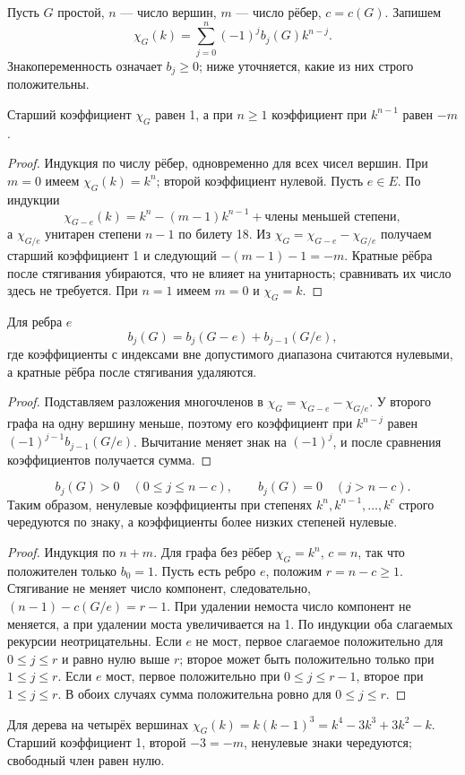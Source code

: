 \begin{definition}
Пусть \(G\) простой, \(n\) — число вершин, \(m\) — число рёбер,
\(c=c(G)\). Запишем
\[
 \chi_G(k)=\sum_{j=0}^n(-1)^j b_j(G)k^{n-j}.
\]
Знакопеременность означает \(b_j\ge0\); ниже уточняется, какие из них строго положительны.
\end{definition}
\begin{theorem}
Старший коэффициент \(\chi_G\) равен 1, а при \(n\ge1\) коэффициент
при \(k^{n-1}\) равен \(-m\).
\end{theorem}
\begin{proof}
Индукция по числу рёбер, одновременно для всех чисел вершин.
При \(m=0\) имеем \(\chi_G(k)=k^n\); второй коэффициент нулевой.
Пусть \(e\in E\). По индукции
\[
\chi_{G-e}(k)=k^n-(m-1)k^{n-1}+\text{члены меньшей степени},
\]
а \(\chi_{G/e}\) унитарен степени \(n-1\) по билету 18.
Из \(\chi_G=\chi_{G-e}-\chi_{G/e}\) получаем старший коэффициент 1
и следующий \(-(m-1)-1=-m\). Кратные рёбра после стягивания
убираются, что не влияет на унитарность; сравнивать их число здесь не требуется.
При \(n=1\) имеем \(m=0\) и \(\chi_G=k\).
\end{proof}
\begin{lemma}
Для ребра \(e\)
\[
 b_j(G)=b_j(G-e)+b_{j-1}(G/e),
\]
где коэффициенты с индексами вне допустимого диапазона считаются нулевыми,
а кратные рёбра после стягивания удаляются.
\end{lemma}
\begin{proof}
Подставляем разложения многочленов в
\(\chi_G=\chi_{G-e}-\chi_{G/e}\). У второго графа на одну вершину меньше,
поэтому его коэффициент при \(k^{n-j}\) равен
\((-1)^{j-1}b_{j-1}(G/e)\). Вычитание меняет знак на \((-1)^j\),
и после сравнения коэффициентов получается сумма.
\end{proof}
\begin{theorem}
\[
 b_j(G)>0\quad(0\le j\le n-c),\qquad
 b_j(G)=0\quad(j>n-c).
\]
Таким образом, ненулевые коэффициенты при степенях
\(k^n,k^{n-1},\ldots,k^c\) строго чередуются по знаку,
а коэффициенты более низких степеней нулевые.
\end{theorem}
\begin{proof}
Индукция по \(n+m\). Для графа без рёбер \(\chi_G=k^n\), \(c=n\),
так что положителен только \(b_0=1\).
Пусть есть ребро \(e\), положим \(r=n-c\ge1\).
Стягивание не меняет число компонент, следовательно,
\((n-1)-c(G/e)=r-1\). При удалении немоста число компонент не меняется,
а при удалении моста увеличивается на 1.
По индукции оба слагаемых рекурсии неотрицательны.
Если \(e\) не мост, первое слагаемое положительно для \(0\le j\le r\)
и равно нулю выше \(r\); второе может быть положительно только при
\(1\le j\le r\). Если \(e\) мост, первое положительно при
\(0\le j\le r-1\), второе при \(1\le j\le r\).
В обоих случаях сумма положительна ровно для \(0\le j\le r\).
\end{proof}
\begin{example}
Для дерева на четырёх вершинах
\(\chi_G(k)=k(k-1)^3=k^4-3k^3+3k^2-k\).
Старший коэффициент 1, второй \(-3=-m\), ненулевые знаки чередуются;
свободный член равен нулю.
\end{example}

